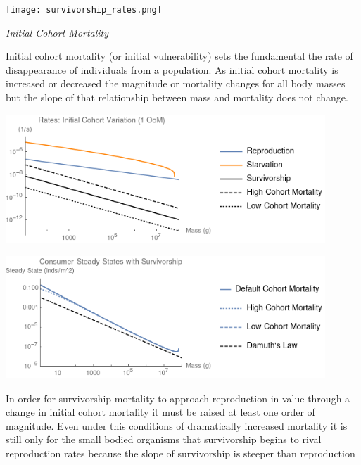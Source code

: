 \documentclass[]{rsos}%
\begin{document}
\texttt{[image: survivorship\_rates.png]}\\

\vspace{1.0cm}


\emph{Initial Cohort Mortality}

Initial cohort mortality (or initial vulnerability) sets the fundamental the rate of disappearance of individuals from a population. As initial cohort mortality is increased or decreased the magnitude or mortality changes for all body masses but the slope of that relationship between mass and mortality does not change. \\

\vspace{0.5cm}

\includegraphics[width=0.9\textwidth]{cohort_plot.png}\\ 

\vspace{0.5cm}

\includegraphics[width=0.9\textwidth]{cohort_damuth_plot.png}\\ 
\vspace{0.5cm}

In order for survivorship mortality to approach reproduction in value through a change in initial cohort mortality it must be raised at least one order of magnitude. Even under this conditions of dramatically increased mortality it is still only for the  small bodied organisms that survivorship begins to rival reproduction rates because the slope of survivorship is steeper than reproduction\\
\end{document}
